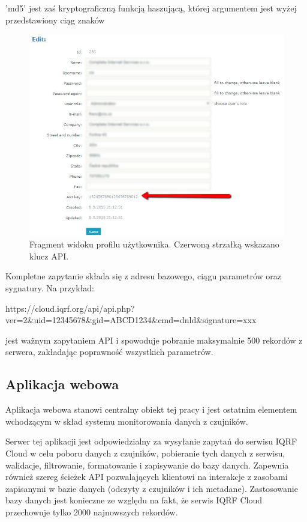 'md5' jest zaś kryptograficzną funkcją haszującą, której argumentem jest wyżej przedstawiony ciąg znaków 


\begin{figure}[H]
    \includegraphics[width=\textwidth]{zdj/api-key.png}
    \caption{Fragment widoku profilu użytkownika. Czerwoną strzałką wskazano klucz API.}
    \label{api-key}
\end{figure}

Kompletne zapytanie składa się z adresu bazowego, ciągu parametrów oraz sygnatury. Na przykład:
\begin{center}
    \begin{small}
        https://cloud.iqrf.org/api/api.php?ver=2\&uid=12345678\&gid=ABCD1234\&cmd=dnld\&signature=xxx
    \end{small}
\end{center}

jest ważnym zapytaniem API i spowoduje pobranie maksymalnie 500 rekordów z serwera, zakładając poprawność wszystkich parametrów.

\subsection{Aplikacja webowa}

Aplikacja webowa stanowi centralny obiekt tej pracy i jest ostatnim elementem wchodzącym w skład systemu monitorowania danych
z czujników. 

Serwer tej aplikacji jest odpowiedzialny za wysyłanie zapytań do serwisu IQRF Cloud w celu poboru danych z czujników, pobieranie
tych danych z serwisu, walidacje, filtrowanie, formatowanie i zapisywanie do bazy danych. Zapewnia również szereg ścieżek API pozwalających
klientowi na interakcje z zasobami zapisanymi w bazie danych (odczyty z czujników i ich metadane). Zastosowanie bazy danych 
jest konieczne ze względu na fakt, że serwis IQRF Cloud przechowuje tylko 2000 najnowszych rekordów.

